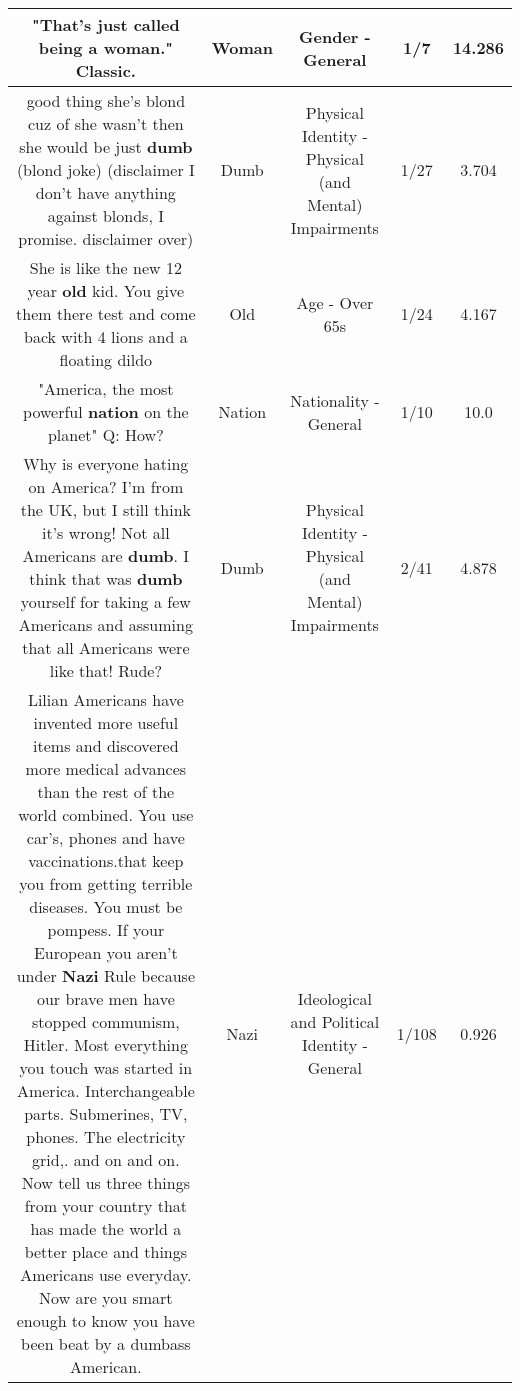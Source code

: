 \documentclass[11pt]{article}
\newlength\mylength
\begin{document}
\begin{center}
\begin{longtable}{|C{.65\mylength}|C{.30\mylength}|C{.12\mylength}|C{.12\mylength}|C{.12\mylength}|}
  \small "That's just called being a \textbf{woman}." Classic.\normalsize   & Woman & Gender - General & 1/7 & 14.286 \\  \hline
  \small good thing she's blond cuz of she wasn't then she would be just \textbf{dumb} (blond joke) (disclaimer I don't have anything against blonds, I promise. disclaimer over)\normalsize   & Dumb & Physical Identity - Physical (and Mental) Impairments & 1/27 & 3.704 \\  \hline
  \small She is like the new 12 year \textbf{old} kid. You give them there test and come back with 4 lions and a floating dildo\normalsize   & Old & Age - Over 65s & 1/24 & 4.167 \\  \hline
  \small "America, the most powerful \textbf{nation} on the planet" Q: How?\normalsize   & Nation & Nationality - General & 1/10 & 10.0 \\  \hline
  \small Why is everyone hating on America? I'm from the UK, but I still think it's wrong! Not all Americans are \textbf{dumb}. I think that was \textbf{dumb} yourself for taking a few Americans and assuming that all Americans were like that! Rude?\normalsize   & Dumb & Physical Identity - Physical (and Mental) Impairments & 2/41 & 4.878 \\  \hline
  \small Lilian Americans have invented more useful items and discovered more medical advances than the rest of the world combined.  You use car's, phones and have vaccinations.that keep you from getting terrible diseases.  You must be pompess.  If your European you aren't under \textbf{Nazi} Rule because our brave men have stopped communism, Hitler.  Most everything you touch was started in America.  Interchangeable parts.   Submerines,  TV, phones.  The electricity grid,. and on and on.  Now tell us three things from your country that has made the world a better place and things Americans use everyday.   Now are you smart enough to know you have been beat by a dumbass American.\normalsize   & Nazi &  Ideological and Political Identity - General & 1/108 & 0.926 \\  \hline

\end{longtable}
\end{center}
\end{document}
